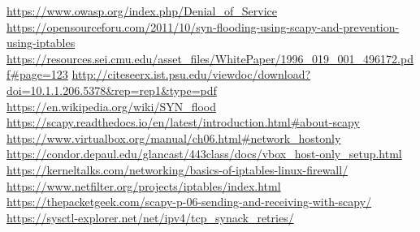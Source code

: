 \documentclass[11pt]{article}
\begin{document}
\url{https://www.owasp.org/index.php/Denial\_of\_Service}\break
\url{https://opensourceforu.com/2011/10/syn-flooding-using-scapy-and-prevention-using-iptables}\break
\url{https://resources.sei.cmu.edu/asset\_files/WhitePaper/1996\_019\_001\_496172.pdf#page=123}\break
\url{http://citeseerx.ist.psu.edu/viewdoc/download?doi=10.1.1.206.5378&rep=rep1&type=pdf}\break
\url{https://en.wikipedia.org/wiki/SYN\_flood}\break
\url{https://scapy.readthedocs.io/en/latest/introduction.html#about-scapy}\break
\url{https://www.virtualbox.org/manual/ch06.html#network\_hostonly}\break
\url{https://condor.depaul.edu/glancast/443class/docs/vbox\_host-only\_setup.html}\break
\url{https://kerneltalks.com/networking/basics-of-iptables-linux-firewall/}\break
\url{https://www.netfilter.org/projects/iptables/index.html}\break
\url{https://thepacketgeek.com/scapy-p-06-sending-and-receiving-with-scapy/}\break
\url{https://sysctl-explorer.net/net/ipv4/tcp\_synack\_retries/}\break

\printindex
\end{document}
